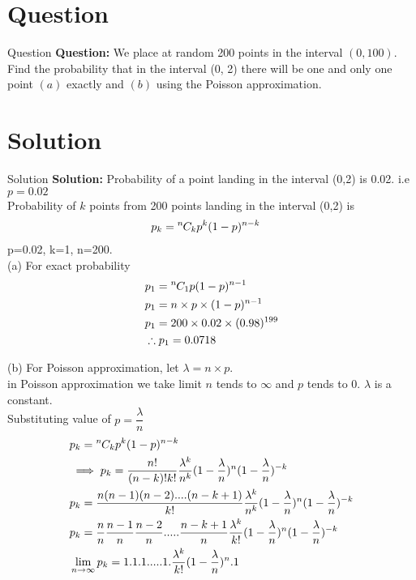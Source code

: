 \documentclass{beamer}
\begin{document}
       \section{Question}
       \begin{frame}{Question}
       \textbf{Question:} We place at random 200 points in the interval $(0, 100)$. Find the probability that in the 
       interval (0, 2) there will be one and only one point $(a)$ exactly and $(b)$ using the Poisson approximation. \\
        \end{frame}
        \section{Solution}
        \begin{frame}{Solution}
       \textbf{Solution:} Probability of a point landing in the interval (0,2) is 0.02. i.e $p=0.02$\\
       Probability of $k$ points from 200 points landing in the interval (0,2) is 
       \begin{align}
        &p_k = {{}^{n}\mkern-1muC_{k}}p^k(1-p)^{n-k}
       \end{align}
       p=0.02, k=1, n=200.\\
       (a) For exact probability
       \begin{align}
       & p_1 = {{}^{n}\mkern-1muC_{1}}p(1-p)^{n-1}\\
        &p_1 = n\times p\times(1-p)^{n-1}\\
        &p_1 = 200\times 0.02\times(0.98)^{199}\\
        &\therefore p_1 = 0.0718
       \end{align}  
        \end{frame}
        \begin{frame}
       (b) For Poisson approximation, let $\lambda=n\times p$.\\
       in Poisson approximation we take limit $n$ tends to $\infty$ and $p$ tends to $0$. $\lambda$ is a constant.\\
       Substituting value of $p=\dfrac{\lambda}{n}$\\ 
       \begin{align}
           &p_k = {{}^{n}\mkern-1muC_{k}}p^k(1-p)^{n-k}\\
           &\implies p_k = \dfrac{n!}{(n-k)!k!}\dfrac{\lambda^k}{n^k}(1-\dfrac{\lambda}{n})^n(1-\dfrac{\lambda}{n})^{-k}\\
         & p_k = \dfrac{n(n-1)(n-2)....(n-k+1)}{k!}\dfrac{\lambda^k}{n^k}(1-\dfrac{\lambda}{n})^n(1-\dfrac{\lambda}{n})^{-k}\\
          &p_k = \dfrac{n}{n}\dfrac{n-1}{n}\dfrac{n-2}{n}.....\dfrac{n-k+1}{n}\dfrac{\lambda^k}{k!}(1-\dfrac{\lambda}{n})^n(1-\dfrac{\lambda}{n})^{-k}\\
          &\lim_{n \to \infty} p_k = 1.1.1.....1.\dfrac{\lambda^k}{k!}(1-\dfrac{\lambda}{n})^n.1\\
       \end{align}
      \end{frame}
\end{document}
